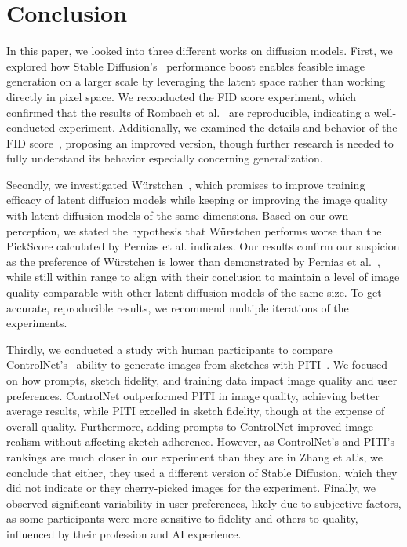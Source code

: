 \section{Conclusion}
In this paper, we looked into three different works on diffusion models. First,
we explored how Stable Diffusion's~\cite{rombach2022stablediffusion}
performance boost enables feasible image generation on a larger scale by
leveraging the latent space rather than working directly in pixel space. We
reconducted the FID score experiment, which confirmed that the results of
Rombach et al.~\cite{rombach2022stablediffusion} are reproducible, indicating a
well-conducted experiment. Additionally, we examined the details and behavior
of the FID score~\cite{heusel2018ganstrainedtimescaleupdate}, proposing an
improved version, though further research is needed to fully understand its
behavior especially concerning generalization.

Secondly, we investigated W\"urstchen~\cite{pernias2024wrstchen}, which promises
to improve training efficacy of latent diffusion models while keeping or
improving the image quality with latent diffusion models of the same dimensions.
Based on our own perception, we stated the hypothesis that W\"urstchen performs
worse than the PickScore calculated by Pernias et al. indicates.
Our results confirm our suspicion as the preference of W\"urstchen is lower
than demonstrated by Pernias et al.~\cite{pernias2024wrstchen}, while still within 
range to align with their conclusion to maintain a level of image quality comparable
with other latent diffusion models of the same size. To get accurate,
reproducible results, we recommend multiple iterations of the experiments.

Thirdly, we conducted a study with human participants to compare
ControlNet's~\cite{zhang2023addingconditionalcontroltexttoimage} ability to
generate images from sketches with
PITI~\cite{wang2022pretrainingneedimagetoimagetranslation}. We focused on how
prompts, sketch fidelity, and training data impact image quality and user
preferences. ControlNet outperformed PITI in image quality, achieving
better average results, while PITI excelled in sketch fidelity, though at the
expense of overall quality. Furthermore, adding prompts to ControlNet improved
image realism without affecting sketch adherence. However, as ControlNet's and 
PITI's rankings are much closer in our experiment than they are in Zhang et al.'s, 
we conclude that either, they used a different version of Stable Diffusion, 
which they did not indicate or they cherry-picked images for the experiment.
Finally, we observed significant variability in user preferences, likely due to
subjective factors, as some participants were more sensitive to fidelity and
others to quality, influenced by their profession and AI experience.

